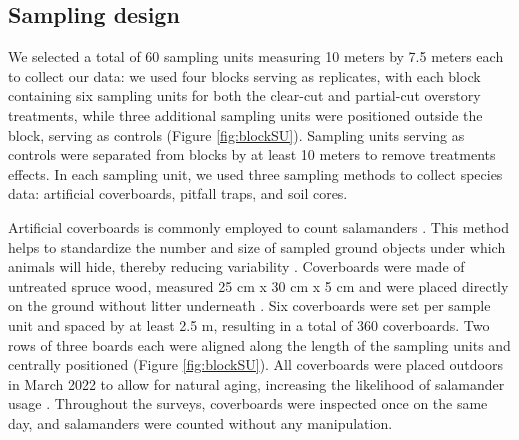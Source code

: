 \subsection*{Sampling design}
\label{subsec:sampling}


We selected a total of 60 sampling units measuring 10 meters by 7.5 meters each to collect our data: we used four blocks serving as replicates, 
with each block containing six sampling units for both the clear-cut and partial-cut overstory treatments, 
while three additional sampling units were positioned outside the block, serving as controls (Figure \ref*{fig:blockSU}).
Sampling units serving as controls were separated from blocks by at least 10 meters to remove treatments effects.
In each sampling unit, we used three sampling methods to collect species data: artificial coverboards, pitfall traps, and soil cores. 

Artificial coverboards is commonly employed to count salamanders \citep{hesedUncoveringSalamanderEcology2012,Mazerolle2021Woodlandsalamander,mooreComparisonPopulationEastern2009c}. 
This method helps to standardize the number and size of sampled ground objects under which animals will hide, thereby reducing variability \citep{hydeSamplingPlethodontidSalamanders2001}. 
Coverboards were made of untreated spruce wood, measured 25 cm x 30 cm x 5 cm and were placed directly on the ground without litter underneath \citep{Mazerolle2021Woodlandsalamander}. 
Six coverboards were set per sample unit and spaced by at least 2.5 m, resulting in a total of 360 coverboards.
Two rows of three boards each were aligned along the length of the sampling units and centrally positioned (Figure \ref{fig:blockSU}).
All coverboards were placed outdoors in March 2022 to allow for natural aging, increasing the likelihood of salamander usage \citep{hedrickEffectsCoverboardAge2021,smithEffectsCoverBoard2014a}.
Throughout the surveys, coverboards were inspected once on the same day, and salamanders were counted without any manipulation.

